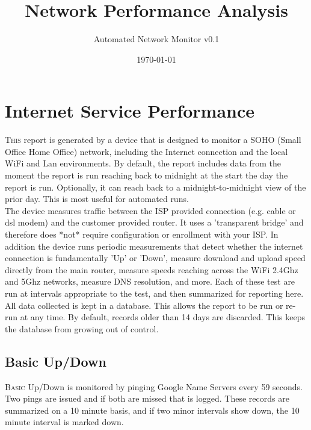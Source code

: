\documentclass[letterpaper,12pt]{article}
\begin{document}
\title{Network Performance Analysis}
\author{Automated Network Monitor v0.1}
\date{\today}
\maketitle

\section{Internet Service Performance}

\lettrine{T}{his}
report is generated by a device that is designed to monitor a SOHO (Small Office Home Office) network, including the Internet connection and the local WiFi and Lan environments. By default, the report includes data from the moment the report is run reaching back to midnight at the start the day the report is run.  Optionally, it can reach back to a midnight-to-midnight view of the prior day. This is most useful for automated runs.\\

The device measures traffic between the ISP provided connection (e.g. cable or dsl modem) and the customer provided router.  It uses a 'transparent bridge' and therefore does *not* require configuration or enrollment with your ISP.  In addition the device runs periodic measurements that detect whether the internet connection is fundamentally 'Up' or 'Down', measure download and upload speed directly from the main router, measure speeds reaching across the WiFi 2.4Ghz and 5Ghz networks, measure DNS resolution, and more. Each of these test are run at intervals appropriate to the test, and then summarized for reporting here. \\

All data collected is kept in a database.  This allows the report to be run or re-run at any time. By default, records older than 14 days are discarded. This keeps the database from growing out of control. \\

\newpage
\begin{landscape}
\section{Basic Up/Down}
\lettrine{B}{asic}
Up/Down is monitored by pinging Google Name Servers every 59 seconds.  Two pings are issued and if both are missed that is logged. These records are summarized on a 10 minute basis, and if two minor intervals show down, the 10 minute interval is marked down. 
\begin{center}
\label{visina8}%
\end{center}
\end{landscape}
\end{document}
